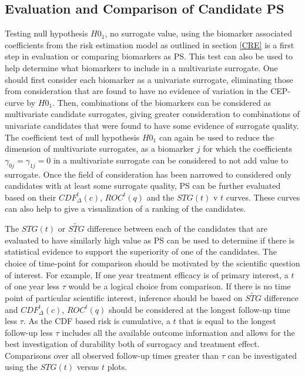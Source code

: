 \documentclass[times, doublespace]{simauth}
\begin{document}
\subsection{Evaluation and Comparison of Candidate PS} \label{DEF}
Testing null hypothesis $H0_1$,  no surrogate value, using the biomarker associated coefficients from the risk estimation model as outlined in section \ref{CRE} is a first step in evaluation or comparing biomarkers as PS.  This test can also be used to help determine what biomarkers to include in a multivariate surrogate. One should first consider each biomarker as a univariate surrogate, eliminating those from consideration that are found to have no evidence of variation in the CEP-curve by $H0_1$. Then, combinations of the biomarkers can be considered as multivariate candidate surrogates, giving greater consideration to combinations of univariate candidates that were found to have some evidence of surrogate quality. The coefficient test of  null hypothesis $H0_1$ can again be used to reduce the dimension of multivariate surrogates, as a biomarker $j$ for which the coefficients $\gamma_{0j}=\gamma_{1j}=0$ in a multivariate surrogate can be considered to not add value to surrogate. Once the field of consideration has been narrowed to considered only candidates with at least some surrogate quality, PS can be further evaluated based on their $CDF^{t}_{\Delta}(c)$, $ROC^{t}(q)$ and the $STG(t)$ v $t$  curves. These curves can also help to give a visualization of a ranking of the candidates. 

The $STG(t)$ or $\widetilde{STG}$ difference between each of the candidates that are evaluated to have similarly high value as PS can be used to determine if there is statistical evidence to support the superiority of one of the candidates. The choice of time-point for comparison should be motivated by the scientific question of interest. For example, If one year treatment efficacy is of primary interest, a $t$ of one year less $\tau$ would be a logical choice from comparison. If there is no time point of particular scientific interest, inference should be based on $\widetilde{STG}$ difference and $CDF^{t}_{\Delta}(c)$, $ROC^{t}(q)$ should be considered at the longest follow-up time less $\tau$. As the CDF based risk is cumulative, a $t$ that is equal to the longest follow-up less $\tau$ includes all the available outcome information and allows for the best investigation of durability both of surrogacy and treatment effect. Comparisons over all observed follow-up times greater than $\tau$ can be investigated using the $STG(t)$ versus $t$ plots.
\end{document}
